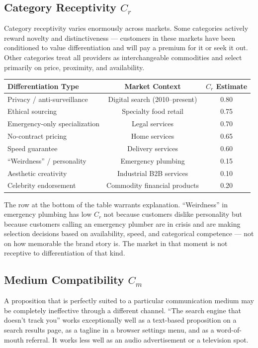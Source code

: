 \documentclass[12pt, openany]{book}
\theoremstyle{thmstyle}
\theoremstyle{defstyle}
\begin{document}
\subsection{Category Receptivity $C_r$}

Category receptivity varies enormously across markets. Some categories actively reward novelty and distinctiveness --- customers in these markets have been conditioned to value differentiation and will pay a premium for it or seek it out. Other categories treat all providers as interchangeable commodities and select primarily on price, proximity, and availability.

\begin{center}
\begin{tabular}{lcc}
\toprule
\textbf{Differentiation Type} & \textbf{Market Context} & \textbf{$C_r$ Estimate} \\
\midrule
Privacy / anti-surveillance & Digital search (2010--present) & 0.80 \\
Ethical sourcing & Specialty food retail & 0.75 \\
Emergency-only specialization & Legal services & 0.70 \\
No-contract pricing & Home services & 0.65 \\
Speed guarantee & Delivery services & 0.60 \\
``Weirdness'' / personality & Emergency plumbing & 0.15 \\
Aesthetic creativity & Industrial B2B services & 0.10 \\
Celebrity endorsement & Commodity financial products & 0.20 \\
\bottomrule
\end{tabular}
\end{center}

The row at the bottom of the table warrants explanation. ``Weirdness'' in emergency plumbing has low $C_r$ not because customers dislike personality but because customers calling an emergency plumber are in crisis and are making selection decisions based on availability, speed, and categorical competence --- not on how memorable the brand story is. The market in that moment is not receptive to differentiation of that kind.

\subsection{Medium Compatibility $C_m$}

A proposition that is perfectly suited to a particular communication medium may be completely ineffective through a different channel. ``The search engine that doesn't track you'' works exceptionally well as a text-based proposition on a search results page, as a tagline in a browser settings menu, and as a word-of-mouth referral. It works less well as an audio advertisement or a television spot.
\end{document}
